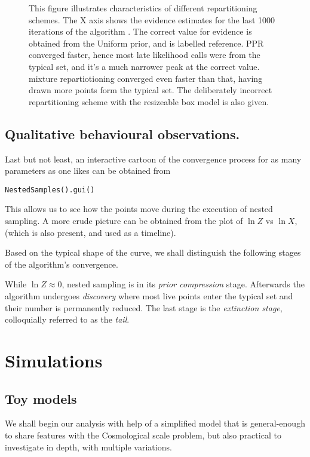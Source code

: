\documentclass[usenatbib]{mnras}
\begin{document}
\begin{figure}

\caption{\label{org5302e5a}
This figure illustrates characteristics of different repartitioning schemes. The X axis shows the evidence estimates for the last 1000 iterations of the algorithm . The correct value for evidence is obtained from the Uniform prior, and is labelled reference. PPR converged faster, hence most late likelihood calls were from the typical set, and it's a much narrower peak at the correct value. mixture repartiotioning converged even faster than that, having drawn more points form the typical set. The deliberately incorrect repartitioning scheme with the resizeable box model is also given.}
\end{figure}


\subsection{Qualitative behavioural observations.}
\label{sec:org41ffa53}
Last but not least, an interactive cartoon of the convergence
process for as many parameters as one likes can be obtained from

\begin{verbatim}
NestedSamples().gui()
\end{verbatim}
This allows us to see how the points move during the execution of
nested sampling. A more crude picture can be obtained from the plot
of \(\ln Z\) vs \(\ln X\), (which is also present, and used as a
timeline).

Based on the typical shape of the curve, we shall distinguish the
following stages of the algorithm's convergence. 

While \(\ln Z \approx 0\), nested sampling is in its \emph{prior
compression} stage.  Afterwards the algorithm undergoes \emph{discovery}
where most live points enter the typical set and their number is
permanently reduced. The last stage is the \emph{extinction stage},
colloquially referred to as the \emph{tail}.


\section{Simulations}
\label{sec:org7eeaaa2}
\subsection{Toy models}
\label{sec:org1d8dd99}

We shall begin our analysis with help of a simplified model that is
general-enough to share features with the Cosmological scale
problem, but also practical to investigate in depth, with multiple
variations.
\end{document}
